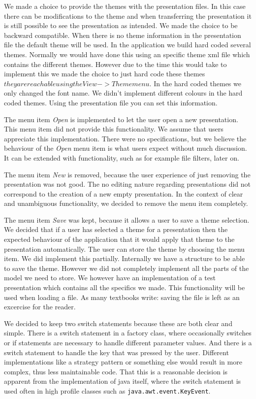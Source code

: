 \documentclass[a4paper]{article}
\begin{document}
We made a choice to provide the themes with the presentation files. In this case there can be modifications to the theme and when transferring the presentation it is still possible to see the presentation as intended. We made the choice to be backward compatible. When there is no theme information in the presentation file the default theme will be used. In the application we build hard coded several themes. Normally we would have done this using an specific theme xml file which contains the different themes. However due to the time this would take to implement this we made the choice to just hard code these themes \(they are reachable using the View->Theme menu. \) In the hard coded themes we only changed the font name. We didn't implement different colours in the hard coded themes. Using the presentation file you can set this information.

The menu item \textit{Open} is implemented to let the user open a new presentation. This menu item did not provide this functionality. We assume that users appreciate this implementation. There were no specifications, but we believe the behaviour of the \textit{Open} menu item is what users expect without much discussion. It can be extended with functionality, such as for example file filters, later on.

The menu item \textit{New} is removed, because the user experience of just removing the presentation was not good. The no editing nature regarding presentations did not correspond to the creation of a new empty presentation. In the context of clear and unambiguous functionality, we decided to remove the menu item completely.

The menu item \textit{Save} was kept, because it allows a user to save a theme selection. We decided that if a user has selected a theme for a presentation then the expected behaviour of the application that it would apply that theme to the presentation automatically. The user can store the theme by choosing the menu item. We did implement this partially. Internally we have a structure to be able to save the theme. However we did not completely implement all the parts of the model we need to store. We however have an implementation of a test presentation which contains all the specifics we made. This functionality will be used when loading a file.
As many textbooks write: saving the file is left as an excercise for the reader.

We decided to keep two switch statements because these are both clear and simple. There is a switch statement in a factory class, where occasionally switches or if statements are necessary to handle different parameter values. And there is a switch statement to handle the key that was pressed by the user. Different implementations like a strategy pattern or something else would result in more complex, thus less maintainable code. That this is a reasonable decision is apparent from the implementation of java itself, where the switch statement is used often in high profile classes such as \texttt{java.awt.event.KeyEvent}.
\end{document}
